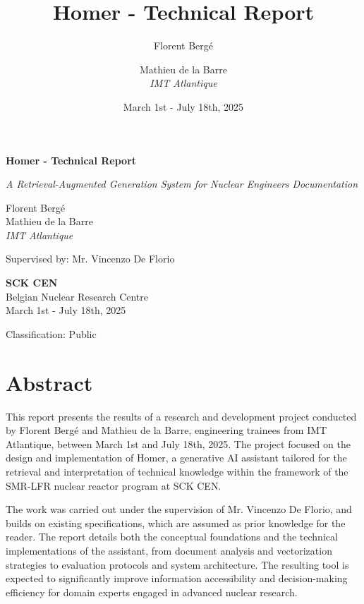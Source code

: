\documentclass[11pt,a4paper]{report}
\title{\textbf{Homer - Technical Report}}
\author{
    Florent Bergé \\
    \and
    Mathieu de la Barre \\
    \textit{IMT Atlantique}
}
\date{March 1st - July 18th, 2025}
\begin{document}
\begin{titlepage}
    \centering
    \vspace*{2cm}
    
    {\huge\bfseries Homer - Technical Report\par}
    \vspace{1cm}
    {\Large\itshape A Retrieval-Augmented Generation System for Nuclear Engineers Documentation\par}
    \vspace{2cm}
    
    {\Large
    Florent Bergé \\
    Mathieu de la Barre \\
    \textit{IMT Atlantique}
    \par}
    \vspace{1cm}
    
    {\large Supervised by: Mr. Vincenzo De Florio\par}
    \vspace{2cm}
    
    {\large
    \textbf{SCK CEN} \\
    Belgian Nuclear Research Centre \\
    March 1st - July 18th, 2025
    \par}
    
    \vfill
    
    {\large
    Classification: Public
    \par}
    
\end{titlepage}

\tableofcontents
\newpage

\section{Abstract}

This report presents the results of a research and development project conducted by Florent Bergé and Mathieu de la Barre, engineering trainees from IMT Atlantique, between March 1st and July 18th, 2025. The project focused on the design and implementation of Homer, a generative AI assistant tailored for the retrieval and interpretation of technical knowledge within the framework of the SMR-LFR nuclear reactor program at SCK CEN.

The work was carried out under the supervision of Mr. Vincenzo De Florio, and builds on existing specifications, which are assumed as prior knowledge for the reader. The report details both the conceptual foundations and the technical implementations of the assistant, from document analysis and vectorization strategies to evaluation protocols and system architecture. The resulting tool is expected to significantly improve information accessibility and decision-making efficiency for domain experts engaged in advanced nuclear research.
\end{document}
